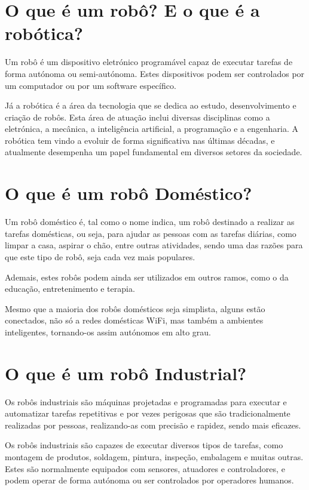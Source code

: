 \documentclass[10pt]{article}
\begin{document}
\section{O que é um robô? E o que é a robótica?}

\hspace{\parindent}Um robô é um dispositivo eletrónico programável capaz de executar tarefas de forma autónoma ou semi-autónoma. Estes dispositivos podem ser controlados por um computador ou por um software específico.

Já a robótica é a área da tecnologia que se dedica ao estudo, desenvolvimento e criação de robôs. Esta área de atuação inclui diversas disciplinas como a eletrónica, a mecânica, a inteligência artificial, a programação e a engenharia. A robótica tem vindo a evoluir de forma significativa nas últimas décadas, e atualmente desempenha um papel fundamental em diversos setores da sociedade.

\section{O que é um robô Doméstico?}
\hspace{\parindent}Um robô doméstico\cite{whatare} é, tal como o nome indica, um robô destinado a realizar as tarefas domésticas, ou seja, para ajudar as pessoas com as tarefas diárias, como limpar a casa, aspirar o chão, entre outras atividades, sendo uma das razões para que este tipo de robô, seja cada vez mais populares.

Ademais, estes robôs podem ainda ser utilizados em outros ramos, como o da educação, entretenimento e terapia.

Mesmo que a maioria dos robôs domésticos seja simplista, alguns estão conectados, não só a redes domésticas WiFi, mas também a ambientes inteligentes, tornando-os assim autónomos em alto grau. 

\section{O que é um robô Industrial?}
\hspace{\parindent}Os robôs industriais\cite{robotnik_2022} são máquinas projetadas e programadas para executar e automatizar tarefas repetitivas e por vezes perigosas que são tradicionalmente realizadas por pessoas, realizando-as com precisão e rapidez, sendo mais eficazes. 

Os robôs industriais são capazes de executar diversos tipos de tarefas, como montagem de produtos, soldagem, pintura, inspeção, embalagem e muitas outras. Estes são normalmente equipados com sensores, atuadores e controladores, e podem operar de forma autónoma ou ser controlados por operadores humanos. 
\end{document}
